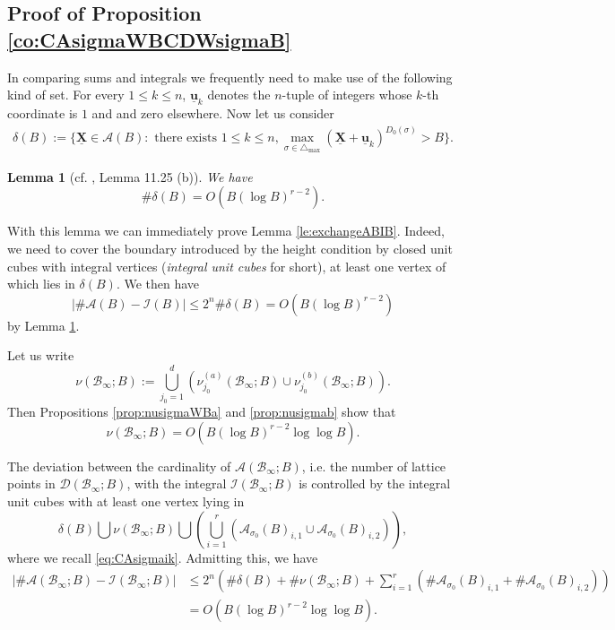 \documentclass[11pt,letterpaper]{amsart}
\newcommand{\CA}{{\mathcal {A}}}
\newcommand{\CB}{{\mathcal {B}}}
\newcommand{\CD}{{\mathcal {D}}}
\newcommand{\CI}{{\mathcal {I}}}
\newcommand{\XX}{\underline{\mathbf{X}}}
\newcommand{\uu}{\underline{\mathbf{u}}}
\theoremstyle{plain}
\numberwithin{equation}{section}
\newtheorem{lemma}[theorem]{Lemma}
\theoremstyle{definition}
\theoremstyle{remark}
\begin{document}
\subsection{Proof of Proposition \ref{co:CAsigmaWBCDWsigmaB}}
In comparing sums and integrals we frequently need to make use of the following kind of set. For every $1\leqslant k\leqslant n$, $\uu_k$ denotes the $n$-tuple of integers whose $k$-th coordinate is $1$ and and zero elsewhere. Now let us consider 
\begin{equation}\label{eq:deltaB}
	\begin{split}
		\delta(B):=\{\XX\in\CA(B):\text{ there exists } 1\leqslant k\leqslant n,\max_{\sigma\in\triangle_{\max}}(\XX+\uu_k)^{D_0(\sigma)}>B\}.	\end{split}
\end{equation}
\begin{lemma}[cf. \cite{Salberger}, Lemma 11.25 (b)]\label{le:deltaB}
	We have $$\#\delta(B)=O(B(\log B)^{r-2}).$$
\end{lemma}
With this lemma we can immediately prove Lemma \ref{le:exchangeABIB}.
Indeed, we need to cover the boundary introduced by the height condition by closed unit cubes with integral vertices (\emph{integral unit cubes} for short), at least one vertex of which lies in $\delta(B)$. We then have $$\left|\#\CA(B)-\CI(B)\right|\leqslant 2^n\#\delta(B)=O(B(\log B)^{r-2})$$ by Lemma \ref{le:deltaB}.


Let us write
\begin{equation}\label{eq:nuCB}
	\nu(\CB_\infty;B):=\bigcup_{j_0=1}^d \left(\nu_{j_0}^{(a)}(\CB_\infty;B)\cup \nu_{j_0}^{(b)}(\CB_\infty;B)\right).
\end{equation}
Then Propositions \ref{prop:nusigmaWBa} and \ref{prop:nusigmab} show that $$\nu(\CB_\infty;B)=O\left(B(\log B)^{r-2}\log\log B\right).$$

	The deviation between the cardinality of $\CA(\CB_\infty;B)$, i.e. the number of lattice points in $\CD(\CB_\infty;B)$, with the integral $\CI(\CB_\infty;B)$ is controlled by the integral unit cubes with at least one vertex lying in 
	$$\delta(B)\bigcup\nu(\CB_\infty;B)\bigcup \left(\bigcup_{i=1}^r\left(\CA_{\sigma_0}(B)_{i,1}\cup \CA_{\sigma_0}(B)_{i,2}\right)\right),$$ where we recall \eqref{eq:CAsigmaik}. 
	Admitting this, we have
	\begin{align*}
		\left|\#\CA(\CB_\infty;B)-\CI(\CB_\infty;B)\right| &\leqslant 2^n\left(\#\delta(B)+\#\nu(\CB_\infty;B)+\sum_{i=1}^{r}\left(\#\CA_{\sigma_0}(B)_{i,1}+\#\CA_{\sigma_0}(B)_{i,2}\right)\right)\\ &=O(B(\log B)^{r-2}\log\log B).
	\end{align*}
\end{document}
